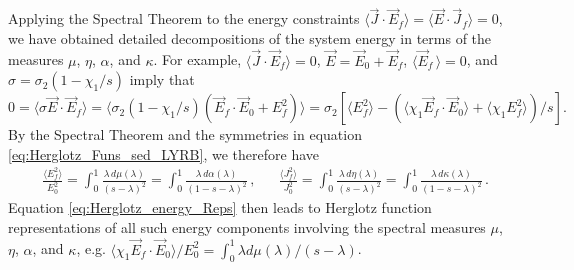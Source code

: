 \documentclass[english,12pt,jmp,graphicx]{revtex4-1}
\begin{document}
Applying the Spectral Theorem to the energy constraints
$\langle\vec{J}\cdot\vec{E}_f\rangle=\langle\vec{E}\cdot\vec{J}_f\rangle=0$, we have obtained detailed
decompositions of the system energy in terms of the measures $\mu$, $\eta$,
$\alpha$, and $\kappa$. For example, $\langle\vec{J}\cdot\vec{E}_f\rangle=0$,
$\vec{E}=\vec{E}_0+\vec{E}_f$, $\langle\vec{E}_f\,\rangle=0$, and
$\sigma=\sigma_2(1-\chi_1/s)$ imply that $0=\langle\sigma\vec{E}\cdot\vec{E}_f\rangle=\langle\sigma_2(1-\chi_1/s)(\vec{E}_f\cdot\vec{E}_0+E_f^2)\rangle
  =\sigma_2\left[\langle E_f^2\rangle- (\langle\chi_1\vec{E}_f\cdot\vec{E}_0\rangle
      + \langle\chi_1E_f^2\rangle)/s\right].$
By the Spectral Theorem \cite{Reed-1980} and the symmetries
in equation \eqref{eq:Herglotz_Funs_sed_LYRB}, we therefore have
%
\begin{align}\label{eq:Herglotz_energy_Reps}
 &\frac{\langle E_f^2\rangle}{E_0^2}=\int_0^1 \frac{\lambda\,d\mu(\lambda)}{(s-\lambda)^2}
           =\int_0^1 \frac{\lambda\,d\alpha(\lambda)}{(1-s-\lambda)^2}\,, 
 &&\frac{\langle J_f^2\rangle}{J_0^2}=\int_0^1 \frac{\lambda\,d\eta(\lambda)}{(s-\lambda)^2}
           =\int_0^1 \frac{\lambda\,d\kappa(\lambda)}{(1-s-\lambda)^2}\,.
\end{align}
%
Equation \eqref{eq:Herglotz_energy_Reps} then leads to Herglotz
function representations of all such energy components involving the
spectral measures $\mu$, $\eta$, $\alpha$, and $\kappa$,
e.g. $\langle\chi_1\vec{E}_f\cdot\vec{E}_0\rangle/E_0^2=\int_0^1\lambda d\mu(\lambda)/(s-\lambda)$.
\end{document}
